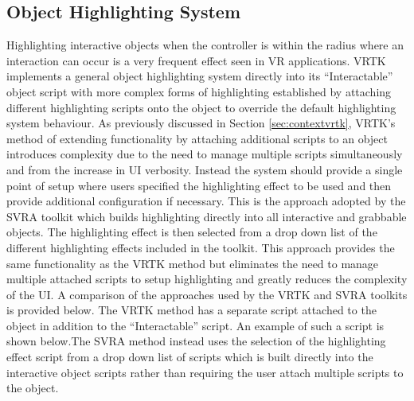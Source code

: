 \documentclass{l4proj}
\begin{document}
\subsection{Object Highlighting System}
\label{sec:decisionhighlightingsystem}
Highlighting interactive objects when the controller is within the radius where an interaction can occur is a very frequent effect seen in VR applications. VRTK implements a general object highlighting system directly into its ``Interactable'' object script with more complex forms of highlighting  established by attaching different highlighting scripts onto the object to override the default highlighting system behaviour. As previously discussed in Section \ref{sec:contextvrtk}, VRTK's method of extending functionality by attaching additional scripts to an object introduces complexity due to the need to manage multiple scripts simultaneously and from the increase in UI verbosity. Instead the system should provide a single point of setup where users specified the highlighting effect to be used and then provide additional configuration if necessary. This is the approach adopted by the SVRA toolkit which builds highlighting directly into all interactive and grabbable objects. The highlighting effect is then selected from a drop down list of the different highlighting effects included in the toolkit. This approach provides the same functionality as the VRTK method but eliminates the need to manage multiple attached scripts to setup highlighting and greatly reduces the complexity of the UI. A comparison of the approaches used by the VRTK and SVRA toolkits is provided below. The VRTK method has a separate script attached to the object in addition to the ``Interactable'' script. An example of such a script is shown below.The SVRA method instead uses the selection of the highlighting effect script from a drop down list of scripts which is built directly into the interactive object scripts rather than requiring the user attach multiple scripts to the object.
\end{document}
